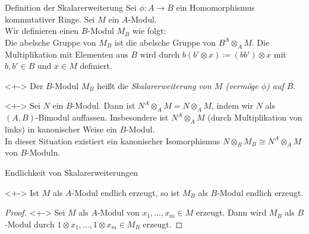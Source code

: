 \begin{frame}{Definition der Skalarerweiterung}
	Sei \(\phi\colon A \to B\) ein Homomorphismus kommutativer Ringe. Sei \(M\) ein \(A\)-Modul.
	\\
	Wir definieren einen \(B\)-Modul \(M_B\) wie folgt:
	\\
	Die abelsche Gruppe von \(M_B\) ist die abelsche Gruppe von \(B^A \otimes_A M\). Die
	Multiplikation mit Elementen aus \(B\) wird durch \(b (b' \otimes x) \coloneqq (b b') \otimes x\)
	mit \(b, b' \in B\) und \(x \in M\) definiert.
	\begin{definition}<+->
		Der \(B\)-Modul \(M_B\) heißt die \emph{Skalarerweiterung von \(M\) (vermöge \(\phi\)) auf \(B\)}.
	\end{definition}
	\begin{example}<+->
		Sei \(N\) ein \(B\)-Modul. Dann ist \(N^A \otimes_A M = N \otimes_A M\), indem wir \(N\) als
		\((A, B)\)-Bimodul auffassen. Insbesondere ist \(N^A \otimes_A M\) (durch Multiplikation von links) in
		kanonischer Weise ein \(B\)-Modul.
		\\	
		In dieser Situation existiert ein kanonischer Isomorphismus \(N \otimes_B M_B \cong
		N^A \otimes_A M\) von \(B\)-Moduln.
	\end{example}
\end{frame}

\begin{frame}{Endlichkeit von Skalarerweiterungen}
	\begin{proposition}<+->
		Ist \(M\) als \(A\)-Modul endlich erzeugt, so ist \(M_B\) als \(B\)-Modul endlich erzeugt.
	\end{proposition}
	\begin{proof}<+->
		Sei \(M\) als \(A\)-Modul von \(x_1, \dotsc, x_m \in M\) erzeugt. Dann wird \(M_B\) als \(B\)-Modul
		durch \(1 \otimes x_1, \dotsc, 1 \otimes x_m \in M_B\) erzeugt.
	\end{proof}
\end{frame}

